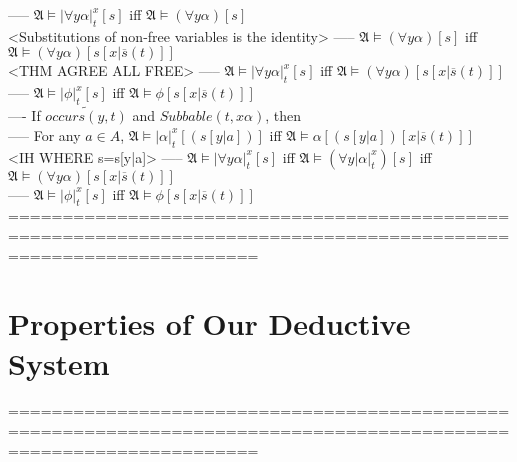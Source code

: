 \documentclass{book}
\newcommand{\pnot}[1]{\widetilde{#1}}
\newcommand{\occurs}[2]{occurs(#1, #2)}
\newcommand{\extend}[1]{\overline{#1}}
\newcommand{\sub}[3]{\left|#1\right|_{#3}^{#2}}
\begin{document}
					----- $\mathfrak{A} \vDash \sub{\forall y \alpha}{x}{t}[s]$ iff $\mathfrak{A} \vDash (\forall y \alpha)[s]$ \\ <Substitutions of non-free variables is the identity>
					----- $\mathfrak{A} \vDash (\forall y \alpha)[s]$ iff $\mathfrak{A} \vDash (\forall y \alpha)[s[x|\extend{s}(t)]]$ \\ <THM AGREE ALL FREE>
					----- $\mathfrak{A} \vDash \sub{\forall y \alpha}{x}{t}[s]$ iff $\mathfrak{A} \vDash (\forall y \alpha)[s[x|\extend{s}(t)]]$ \\
					----- $\mathfrak{A} \vDash \sub{\phi}{x}{t}[s]$ iff $\mathfrak{A} \vDash \phi[s[x|\extend{s}(t)]]$ \\
				---- If $\pnot{\occurs{y}{t}}$ and $Subbable(t, x \alpha)$, then \\
					----- For any $a \in A$, $\mathfrak{A} \vDash \sub{\alpha}{x}{t}[(s[y|a])]$ iff $\mathfrak{A} \vDash \alpha[(s[y|a])[x|\extend{s}(t)]]$ \\ <IH WHERE s=s[y|a]>
					----- $\mathfrak{A} \vDash \sub{\forall y \alpha}{x}{t}[s]$ iff $\mathfrak{A} \vDash (\forall y \sub{\alpha}{x}{t})[s]$ iff $\mathfrak{A} \vDash (\forall y \alpha)[s[x|\extend{s}(t)]]$ \\
					----- $\mathfrak{A} \vDash \sub{\phi}{x}{t}[s]$ iff $\mathfrak{A} \vDash \phi[s[x|\extend{s}(t)]]$ \\
	===================================================================================================================

\section{Properties of Our Deductive System}
	===================================================================================================================
\end{document}
